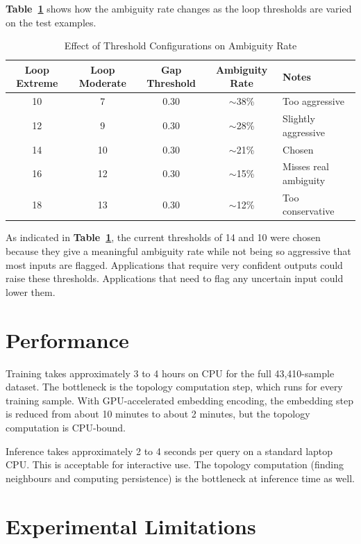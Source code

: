 \textbf{Table~\ref{tab:thresh}} shows how the ambiguity rate changes as the loop thresholds are varied
on the test examples.

\begin{table}[H]
\centering
\caption{Effect of Threshold Configurations on Ambiguity Rate}
\label{tab:thresh}
\begin{tabular}{ccccl}
\toprule
\textbf{Loop Extreme} & \textbf{Loop Moderate} & \textbf{Gap Threshold} & \textbf{Ambiguity Rate} & \textbf{Notes} \\
\midrule
10 & 7  & 0.30 & $\sim$38\% & Too aggressive \\
12 & 9  & 0.30 & $\sim$28\% & Slightly aggressive \\
14 & 10 & 0.30 & $\sim$21\% & Chosen \\
16 & 12 & 0.30 & $\sim$15\% & Misses real ambiguity \\
18 & 13 & 0.30 & $\sim$12\% & Too conservative \\
\bottomrule
\end{tabular}
\end{table}

As indicated in \textbf{Table~\ref{tab:thresh}}, the current thresholds of 14 and 10 were chosen because
they give a meaningful ambiguity rate while not being so aggressive that most inputs are flagged.
Applications that require very confident outputs could raise these thresholds. Applications that
need to flag any uncertain input could lower them.

\section{Performance}

Training takes approximately 3 to 4 hours on CPU for the full 43,410-sample dataset. The
bottleneck is the topology computation step, which runs for every training sample. With
GPU-accelerated embedding encoding, the embedding step is reduced from about 10 minutes to
about 2 minutes, but the topology computation is CPU-bound.

Inference takes approximately 2 to 4 seconds per query on a standard laptop CPU. This is
acceptable for interactive use. The topology computation (finding neighbours and computing
persistence) is the bottleneck at inference time as well.

\section{Experimental Limitations}

